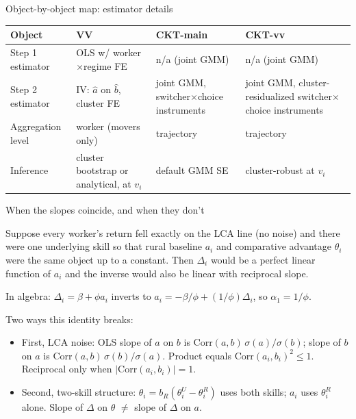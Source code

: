 \documentclass[10pt,aspectratio=169]{beamer}
\newcommand{\thetai}{\theta_{i}}
\newcommand{\Deltai}{\Delta_{i}}
\newcommand{\phicoef}{\phi}
\newcommand{\vii}{v_{i}}
\begin{document}
\begin{frame}[allowframebreaks]{Object-by-object map: estimator details}

  \begin{center}
  \begin{tabular}{p{2.5cm}p{3.2cm}p{3.0cm}p{3.4cm}}
    \toprule
    Object & VV & CKT-main & CKT-vv \\
    \midrule
    Step 1 estimator
      & OLS w/ worker$\times$regime FE
      & n/a (joint GMM)
      & n/a (joint GMM) \\
    Step 2 estimator
      & IV: $\hat a$ on $\hat b$, cluster FE
      & joint GMM, switcher$\times$choice instruments
      & joint GMM, cluster-residualized switcher$\times$choice instruments \\
    Aggregation level
      & worker (movers only)
      & trajectory
      & trajectory \\
    Inference
      & cluster bootstrap or analytical, at $\vii$
      & default GMM SE
      & cluster-robust at $\vii$ \\
    \bottomrule
  \end{tabular}
  \end{center}

\end{frame}

\begin{frame}{When the slopes coincide, and when they don't}

  Suppose every worker's return fell exactly on the LCA line (no noise) and there were one underlying skill so that rural baseline $a_i$ and comparative advantage $\thetai$ were the same object up to a constant.
  Then $\Deltai$ would be a perfect linear function of $a_i$ and the inverse would also be linear with reciprocal slope.

  \vspace{0.4em}
  In algebra: $\Deltai = \beta + \phicoef a_i$ inverts to $a_i = -\beta/\phicoef + (1/\phicoef)\Deltai$, so $\alpha_1 = 1/\phicoef$.

  \vspace{0.4em}
  Two ways this identity breaks:
  \begin{itemize}
    \item First, LCA noise: OLS slope of $a$ on $b$ is $\mathrm{Corr}(a,b)\,\sigma(a)/\sigma(b)$;
          slope of $b$ on $a$ is $\mathrm{Corr}(a,b)\,\sigma(b)/\sigma(a)$.
          Product equals $\mathrm{Corr}(a_i,b_i)^2 \le 1$.
          Reciprocal only when $|\mathrm{Corr}(a_i,b_i)| = 1$.
    \item Second, two-skill structure: $\thetai = b_R(\theta_i^U - \theta_i^R)$ uses both skills; $a_i$ uses $\theta_i^R$ alone.
          Slope of $\Delta$ on $\theta$ $\ne$ slope of $\Delta$ on $a$.
  \end{itemize}


\end{frame}
\end{document}
